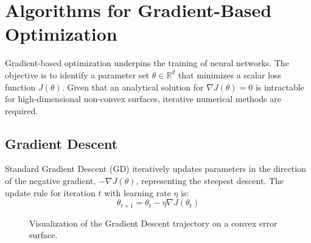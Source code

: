 \section{Algorithms for Gradient-Based Optimization}

Gradient-based optimization underpins the training of neural networks. The objective is to identify a parameter set $\theta \in \mathbb{R}^d$ that minimizes a scalar loss function $J(\theta)$. Given that an analytical solution for $\nabla J(\theta) = 0$ is intractable for high-dimensional non-convex surfaces, iterative numerical methods are required.

\subsection{Gradient Descent}

Standard Gradient Descent (GD) iteratively updates parameters in the direction of the negative gradient, $-\nabla J(\theta)$, representing the steepest descent. The update rule for iteration $t$ with learning rate $\eta$ is:
\begin{equation}
    \theta_{t+1} = \theta_t - \eta \nabla J(\theta_t)
\end{equation}

\begin{figure}[h]
	\centering
	\caption{Visualization of the Gradient Descent trajectory on a convex error surface.}
	\label{fig:gradient_descent}
\end{figure}


